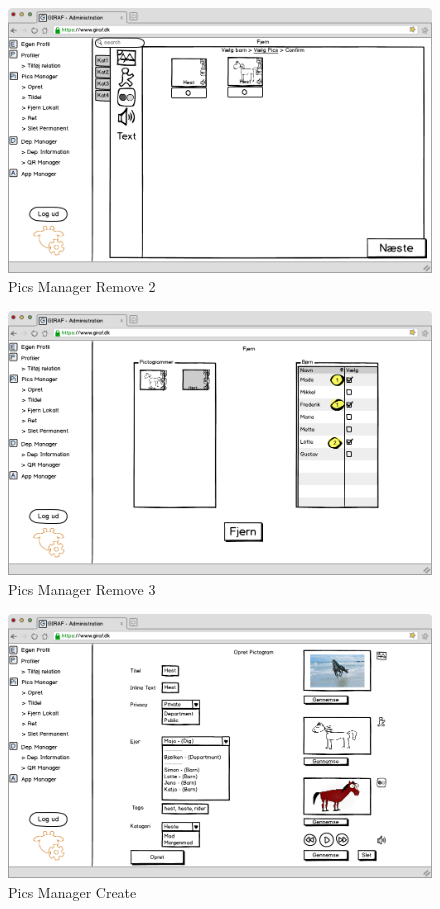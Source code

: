 \begin{figure}[p]
\centering
\includegraphics[width=14cm]{images/mockup/picsManagerFjern2.png}
\caption{Pics Manager Remove 2}
\label{fig:pics_manager_remove2}
\end{figure}

\newpage

\begin{figure}[p]
\centering
\includegraphics[width=14cm]{images/mockup/picsManagerFjern3.png}
\caption{Pics Manager Remove 3}
\label{fig:pics_manager_remove3}
\end{figure}

\begin{figure}[p]
\centering
\includegraphics[width=14cm]{images/mockup/picsManagerOpret.png}
\caption{Pics Manager Create}
\label{fig:pics_manager_create}
\end{figure}

